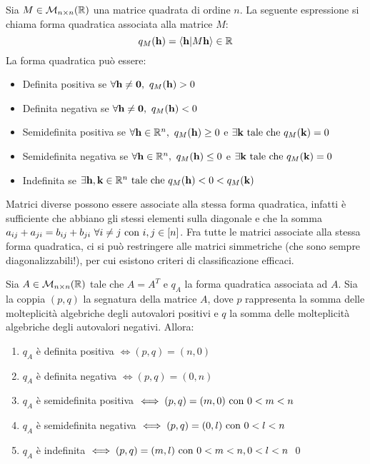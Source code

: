 Sia $M \in \mathcal{M}_{n \times n}(\mathbb{R})$ una matrice quadrata di ordine $n$. La seguente espressione si chiama forma quadratica associata alla matrice $M$:
$$
    q_M(\vb{h}) = \ip{\vb{h}}{M\vb{h}} \in \R
$$
La forma quadratica può essere:
\begin{itemize}
    \item Definita positiva se $\forall \vb{h}\neq \vb{0}, \ q_M(\vb{h})> 0$
    \item Definita negativa se $\forall \vb{h}\neq \vb{0}, \ q_M(\vb{h}) < 0$
    \item Semidefinita positiva se $\forall \vb{h}\in \mathbb{R}^n, \ q_M(\vb{h}) \geq 0$ e $\exists \vb{k} \text{ tale che } q_M(\vb{k})=0$
    \item Semidefinita negativa se $\forall \vb{h}\in \mathbb{R}^n, \ q_M(\vb{h}) \leq 0$ e $\exists \vb{k} \text{ tale che } q_M(\vb{k})=0$
    \item Indefinita se $\exists \vb{h}, \vb{k} \in \mathbb{R}^n \text{ tale che } q_M(\vb{h}) < 0 < q_M(\vb{k})$
\end{itemize}

Matrici diverse possono essere associate alla stessa forma quadratica, infatti è sufficiente che abbiano gli stessi elementi sulla diagonale e che la somma $a_{ij}+a_{ji}=b_{ij}+b_{ji} \ \forall i\neq j\text{ con } i,j \in [n]$. Fra tutte le matrici associate alla stessa forma quadratica, ci si può restringere alle matrici simmetriche (che sono sempre diagonalizzabili!), per cui esistono criteri di classificazione efficaci.

\begin{theorem}
    Sia $A \in \mathcal{M}_{n\times n}(\mathbb{R})$ tale che $A=A^T$ e $q_A$ la forma quadratica associata ad $A$. Sia la coppia $(p,q)$ la segnatura della matrice $A$, dove $p$ rappresenta la somma delle molteplicità algebriche degli autovalori positivi e $q$ la somma delle molteplicità algebriche degli autovalori negativi. Allora:
    \begin{enumerate}
        \item $q_A$ è definita positiva $\iff (p,q)=(n,0)$
        \item $q_A$ è definita negativa $\iff (p,q)=(0,n)$
        \item $q_A$ è semidefinita positiva $\iff (p,q)=(m,0) \text{ con } 0< m < n$
        \item $q_A$ è semidefinita negativa $\iff (p,q)=(0,l) \text{ con } 0< l < n$
        \item $q_A$ è indefinita $\iff (p,q)=(m,l) \text{ con } 0<m<n,0<l<n$
        \qed
    \end{enumerate}
\end{theorem}

